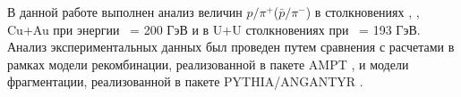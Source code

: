 В данной работе выполнен анализ величин $p/\pi^{+}$($\bar{p}/\pi^{-}$) в столкновениях \pal, \heau, Cu+Au при энергии \sqsn \ = 200 ГэВ и в U+U столкновениях при \sqsn \ = 193 ГэВ. Анализ экспериментальных данных был проведен путем сравнения с расчетами в рамках модели рекомбинации, реализованной в пакете AMPT \cite{AMPT}, и модели фрагментации, реализованной в пакете PYTHIA/ANGANTYR \cite{pythia}. 
